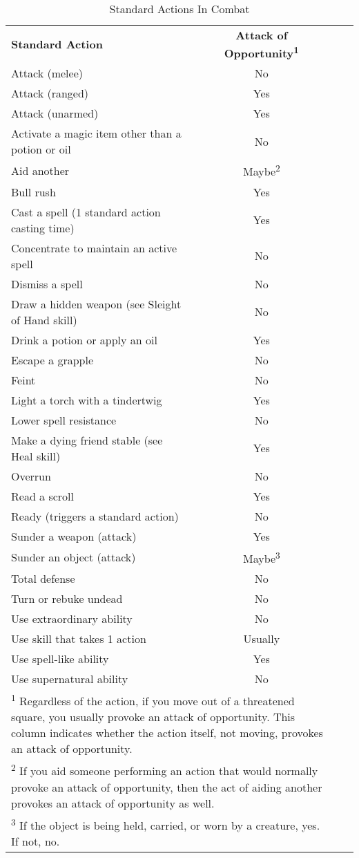 \begin{table}[htb]
\caption{Standard Actions In Combat}
\centering
\begin{tabular}{l c l c}
\textbf{Standard Action} & \textbf{Attack of Opportunity\textsuperscript{1}}\\
Attack (melee) & No\\
Attack (ranged) & Yes\\
Attack (unarmed) & Yes\\
Activate a magic item other than a potion or oil & No\\
Aid another & Maybe\textsuperscript{2}\\
Bull rush & Yes\\
Cast a spell (1 standard action casting time) & Yes\\
Concentrate to maintain an active spell & No\\
Dismiss a spell & No\\
Draw a hidden weapon (see Sleight of Hand skill) & No\\
Drink a potion or apply an oil & Yes\\
Escape a grapple & No\\
Feint & No\\
Light a torch with a tindertwig & Yes\\
Lower spell resistance & No\\
Make a dying friend stable (see Heal skill) & Yes\\
Overrun & No\\
Read a scroll & Yes\\
Ready (triggers a standard action) & No\\
Sunder a weapon (attack) & Yes\\
Sunder an object (attack) & Maybe\textsuperscript{3}\\
Total defense & No\\
Turn or rebuke undead & No\\
Use extraordinary ability & No\\
Use skill that takes 1 action & Usually\\
Use spell-like ability & Yes\\
Use supernatural ability & No\\
\multicolumn{2}{p{12.5cm}}{\textsuperscript{1} Regardless of the action, if you move out of a threatened square, you usually provoke an attack of opportunity. This column indicates whether the action itself, not moving, provokes an attack of opportunity.}\\
\multicolumn{2}{p{12.5cm}}{\textsuperscript{2} If you aid someone performing an action that would normally provoke an attack of opportunity, then the act of aiding another provokes an attack of opportunity as well.}\\
\multicolumn{2}{p{12.5cm}}{\textsuperscript{3} If the object is being held, carried, or worn by a creature, yes. If not, no.}\\
\end{tabular}
\end{table}


